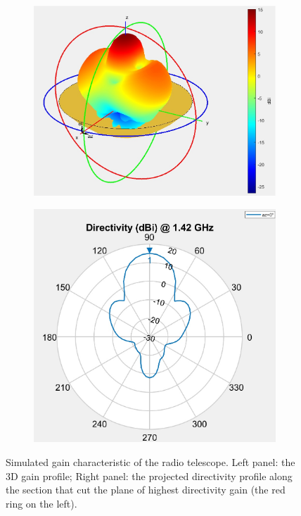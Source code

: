 \documentclass[12pt]{article}
\begin{document}
    \begin{figure}
    \centering
    \begin{subfigure}[b]{0.45\textwidth}
        \centering
	    \includegraphics[width=\textwidth]{plots/beam_pattern_3d.jpg}
	    \label{fig: beam_pattern_3d}
    \end{subfigure}
    \hfill
    \begin{subfigure}[b]{0.45\textwidth}
	    \centering
	    \includegraphics[width=\textwidth]{plots/directivity.jpg}
	    \label{fig: directivity}
    \end{subfigure}
        \caption{Simulated gain characteristic of the radio telescope. Left panel: the 3D gain profile; Right panel: the projected directivity profile along the section that cut the plane of highest directivity gain (the red ring on the left). }
        \label{fig: beam}
    \end{figure}
    
\end{document}
